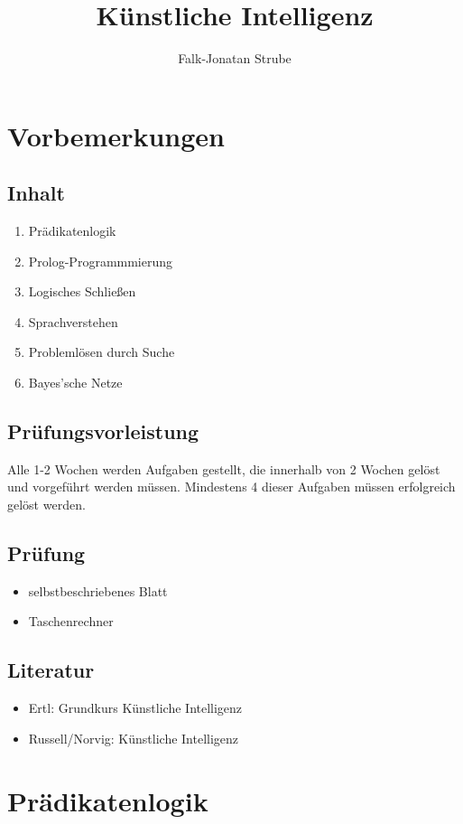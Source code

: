 \documentclass{scrreprt}
\title{Künstliche Intelligenz}
\author{Falk-Jonatan Strube}
\begin{document}
\maketitle
\tableofcontents

\chapter*{Vorbemerkungen}
\section*{Inhalt}
\begin{enumerate}
\item Prädikatenlogik
\item Prolog-Programmmierung
\item Logisches Schließen
\item Sprachverstehen
\item Problemlösen durch Suche
\item Bayes'sche Netze
\end{enumerate}

\section*{Prüfungsvorleistung}
Alle 1-2 Wochen werden Aufgaben gestellt, die innerhalb von 2 Wochen gelöst und vorgeführt werden müssen. Mindestens 4 dieser Aufgaben müssen erfolgreich gelöst werden.

\section*{Prüfung}
\begin{itemize}
\item selbstbeschriebenes Blatt
\item Taschenrechner
\end{itemize}

\section*{Literatur}
\begin{itemize}
\item Ertl: Grundkurs Künstliche Intelligenz
\item Russell/Norvig: Künstliche Intelligenz
\end{itemize}

\chapter{Prädikatenlogik}

\end{document}
